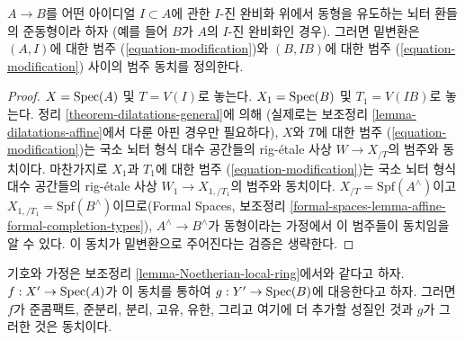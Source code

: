 \begin{lemma}
\label{lemma-Noetherian-local-ring}
$A \to B$를 어떤 아이디얼 $I \subset A$에 관한 $I$-진 완비화 위에서
동형을 유도하는 뇌터 환들의 준동형이라 하자
(예를 들어 $B$가 $A$의 $I$-진 완비화인 경우).
그러면 밑변환은 $(A, I)$에 대한 범주
(\ref{equation-modification})와 $(B, IB)$에 대한 범주
(\ref{equation-modification}) 사이의 범주 동치를 정의한다.
\end{lemma}

\begin{proof}
$X = \mathop{\mathrm{Spec}}(A)$ 및 $T = V(I)$로 놓는다.
$X_1 = \mathop{\mathrm{Spec}}(B)$ 및 $T_1 = V(IB)$로 놓는다.
정리 \ref{theorem-dilatations-general}에 의해
(실제로는 보조정리 \ref{lemma-dilatations-affine}에서 다룬 아핀 경우만 필요하다),
$X$와 $T$에 대한 범주 (\ref{equation-modification})는
국소 뇌터 형식 대수 공간들의 rig-\'etale 사상
$W \to X_{/T}$의 범주와 동치이다. 마찬가지로
$X_1$과 $T_1$에 대한 범주 (\ref{equation-modification})는
국소 뇌터 형식 대수 공간들의 rig-\'etale 사상
$W_1 \to X_{1, /T_1}$의 범주와 동치이다.
$X_{/T} = \text{Spf}(A^\wedge)$이고
$X_{1, /T_1} = \text{Spf}(B^\wedge)$이므로(Formal Spaces, 보조정리
\ref{formal-spaces-lemma-affine-formal-completion-types}),
$A^\wedge \to B^\wedge$가 동형이라는 가정에서
이 범주들이 동치임을 알 수 있다.
이 동치가 밑변환으로 주어진다는 검증은 생략한다.
\end{proof}

\begin{lemma}
\label{lemma-Noetherian-local-ring-properties}
기호와 가정은 보조정리 \ref{lemma-Noetherian-local-ring}에서와 같다고 하자.
$f : X' \to \mathop{\mathrm{Spec}}(A)$가 이 동치를 통하여
$g : Y' \to \mathop{\mathrm{Spec}}(B)$에 대응한다고 하자. 그러면 $f$가
준콤팩트, 준분리, 분리, 고유, 유한, 그리고 여기에 더 추가할 성질인 것과
$g$가 그러한 것은 동치이다.
\end{lemma}

